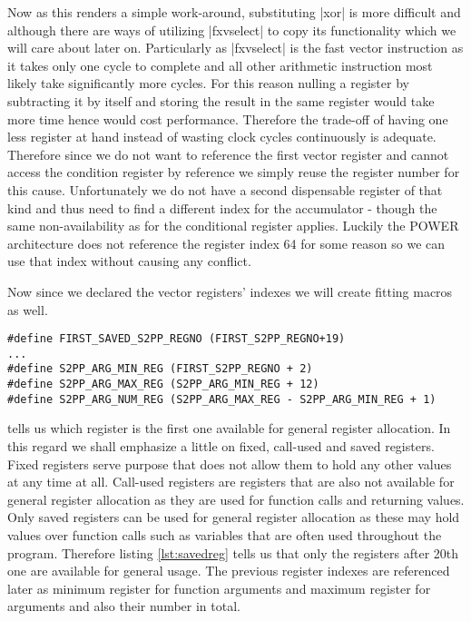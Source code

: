 Now as this renders a simple work-around, substituting |xor| is more difficult and although there are ways of utilizing |fxvselect| to copy its functionality  which we will care about later on.
Particularly as |fxvselect| is the fast vector instruction as it takes only one cycle to complete and all other arithmetic instruction most likely take significantly more cycles.
For this reason nulling a register by subtracting it by itself and storing the result in the same register would take more time hence would cost performance.
Therefore the trade-off of having one less register at hand instead of wasting clock cycles continuously is adequate.
Therefore since we do not want to reference the first vector register and cannot access the condition register by reference we simply reuse the register number for this cause.
Unfortunately we do not have a second dispensable register of that kind and thus need to find a different index for the accumulator - though the same non-availability as for the conditional register applies.
Luckily the POWER architecture does not reference the register index 64 for some reason so we can use that index without causing any conflict.

Now since we declared the vector registers' indexes we will create fitting macros as well.
\begin{lstlisting}[label=lst:savedreg]
#define FIRST_SAVED_S2PP_REGNO (FIRST_S2PP_REGNO+19)
...
#define S2PP_ARG_MIN_REG (FIRST_S2PP_REGNO + 2)
#define S2PP_ARG_MAX_REG (S2PP_ARG_MIN_REG + 12)
#define S2PP_ARG_NUM_REG (S2PP_ARG_MAX_REG - S2PP_ARG_MIN_REG + 1)
\end{lstlisting}
tells us which register is the first one available for general register allocation.
In this regard we shall emphasize a little on fixed, call-used and saved registers.
Fixed registers serve purpose that does not allow them to hold any other values at any time at all.
Call-used registers are registers that are also not available for general register allocation as they are used for function calls and returning values.
Only saved registers can be used for general register allocation as these may hold values over function calls such as variables that are often used throughout the program.
Therefore listing \ref{lst:savedreg} tells us that only the registers after 20th one are available for general usage. 
The previous register indexes are referenced later as minimum register for function arguments and maximum register for arguments and also their number in total.

